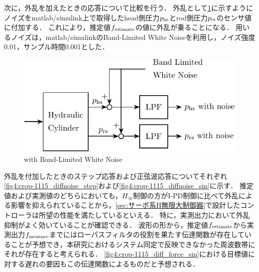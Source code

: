 次に，外乱を加えたときの応答について比較を行う．
外乱として\figname\ref{fig4:withBLWN-crop}に示すようにノイズをmatlab/simulink上で取得したhead側圧力$p_\mathrm{hs}$とrod側圧力$p_\mathrm{rs}$のセンサ値に付加する．
これにより，推定値$f_\mathrm{estimate}$の値に外乱が乗ることになる．
用いるノイズは，matlab/simulinkのBand-Limited White Noiseを利用し，ノイズ強度0.01，サンプル時間0.001とした．

\begin{figure}[t]
    \centering
        \includegraphics[keepaspectratio, scale=1.0]{contents/ForceControl/figure/TikZ/withBLWN-crop.pdf}
        \caption{with Band-Limited White Noise}
        \label{fig4:withBLWN-crop}
\end{figure}

外乱を付加したときのステップ応答および正弦波応答についてそれぞれ\figname\ref{fig4:crop-1115_diffnoise_step}および\figname\ref{fig4:crop-1115_diffnoise_sin}に示す．
推定値および実測値のどちらにおいても，$H_\infty$制御の方がI-PD制御に比べて外乱による影響を抑えられていることから，\ref{sec:サーボ系H無限大制御器}で設計したコントローラは所望の性能を満たしているといえる．
特に，実測出力において外乱抑制がよく効いていることが確認できる．
波形の形から，推定値$f_\mathrm{estimate}$から実測出力$f_\mathrm{measure}$までにはローパスフィルタの役割を果たす伝達関数が存在していることが予想でき，本研究におけるシステム同定で反映できなかった周波数帯にそれが存在すると考えられる．
\figname\ref{fig4:crop-1115_diff_force_sin}における目標値に対する遅れの要因もこの伝達関数によるものだと予想される．

